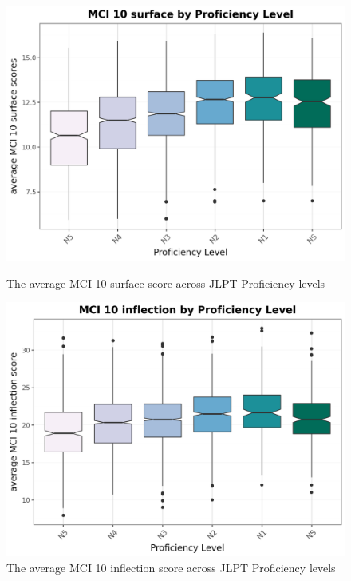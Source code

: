 \begin{figure}[htbp]
    \centering
    \begin{minipage}{.48\textwidth}
        \centering
    \includegraphics[scale=.4]{img/MCI10surface}
    \caption[MCI 10 surface scores across Proficiency levels]{The average MCI 10 surface score across JLPT Proficiency levels}
        \label{fig:MCI10surface}
    \end{minipage}
    \hfill
\begin{minipage}{.48\textwidth}
        \centering
        \includegraphics[scale=.4]{img/MCI10inflection}
        \caption[MCI 10 inflection scores across Proficiency levels]{The average MCI 10 inflection score across JLPT Proficiency levels}
\label{fig:MCI10inflection}
\end{minipage}
    \end{figure}

